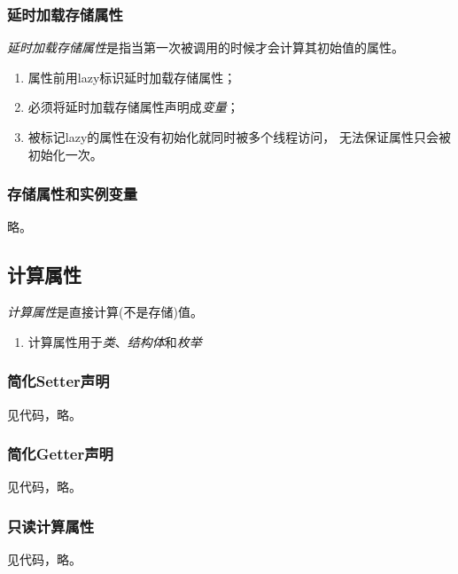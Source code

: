 \documentclass{../main.tex}{subfiles}
\begin{document}
\subsubsection{延时加载存储属性}
\emph{延时加载存储属性}是指当第一次被调用的时候才会计算其初始值的属性。
\begin{enumerate}[itemsep=0pt, parsep=0pt, topsep=0pt, partopsep=0pt]
    \item 属性前用lazy标识延时加载存储属性；
    \item 必须将延时加载存储属性声明成\emph{变量}；
    \item 被标记lazy的属性在没有初始化就同时被多个线程访问，
        无法保证属性只会被初始化一次。
\end{enumerate}

\subsubsection{存储属性和实例变量}
略。

\subsection{计算属性}
\emph{计算属性}是直接计算(不是存储)值。
\begin{enumerate}[itemsep=0pt, parsep=0pt, topsep=0pt, partopsep=0pt]
    \item 计算属性用于\emph{类}、\emph{结构体}和\emph{枚举}
\end{enumerate}
\subsubsection{简化Setter声明}
见代码，略。

\subsubsection{简化Getter声明}
见代码，略。

\subsubsection{只读计算属性}
见代码，略。
\end{document}

